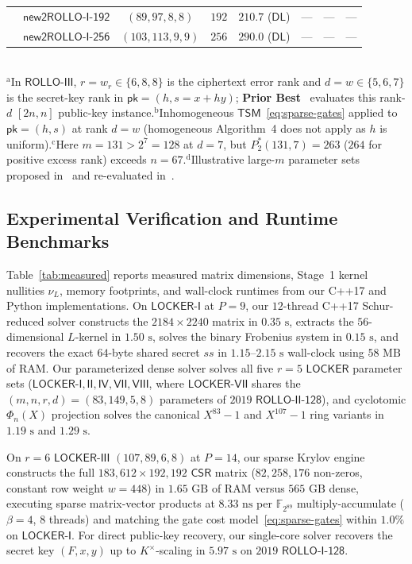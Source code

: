 \documentclass[11pt,a4paper]{article}
\theoremstyle{definition}
\theoremstyle{remark}
\newcommand{\F}{\mathbb{F}}
\newcommand{\TSM}{\mathsf{TSM}}
\begin{document}
\begin{table}[p]
\begin{tabular}{@{}llcccccc@{}}
 & $\mathsf{new2ROLLO\text{-}I\text{-}192}$ & $(89, 97, 8, 8)$ & $192$ & $210.7$ ($\mathsf{DL}$) & --- & --- & --- \\
 & $\mathsf{new2ROLLO\text{-}I\text{-}256}$ & $(103, 113, 9, 9)$ & $256$ & $290.0$ ($\mathsf{DL}$) & --- & --- & --- \\
\bottomrule
\end{tabular}
\\[0.3em]
{\scriptsize $^{\mathrm{a}}$In $\mathsf{ROLLO\text{-}III}$, $r = w_r \in \{6,8,8\}$ is the ciphertext error rank and $d = w \in \{5,6,7\}$ is the secret-key rank in $\mathsf{pk} = (h, s = x + hy)$; \textbf{Prior Best}~\cite{BBC+20,EVV26} evaluates this rank-$d$ $[2n,n]$ public-key instance.\quad $^{\mathrm{b}}$Inhomogeneous $\TSM$~\eqref{eq:sparse-gates} applied to $\mathsf{pk} = (h, s)$ at rank $d = w$ (homogeneous Algorithm~4 does not apply as $h$ is uniform).\quad $^{\mathrm{c}}$Here $m = 131 > 2^7 = 128$ at $d = 7$, but $P_2^*(131, 7) = 263$ ($264$ for positive excess rank) exceeds $n = 67$.\quad $^{\mathrm{d}}$Illustrative large-$m$ parameter sets proposed in~\cite{BBC+20} and re-evaluated in~\cite{BBGT23}.}
\end{table}

\subsection{Experimental Verification and Runtime Benchmarks}
Table~\ref{tab:measured} reports measured matrix dimensions, Stage~1 kernel nullities $\nu_L$, memory footprints, and wall-clock runtimes from our C++17 and Python implementations. On $\mathsf{LOCKER\text{-}I}$ at $P = 9$, our $12$-thread C++17 Schur-reduced solver constructs the $2184 \times 2240$ matrix in $0.35\text{ s}$, extracts the $56$-dimensional $L$-kernel in $1.50\text{ s}$, solves the binary Frobenius system in $0.15\text{ s}$, and recovers the exact $64$-byte shared secret $ss$ in $1.15\text{--}2.15\text{ s}$ wall-clock using $58\text{ MB}$ of RAM. Our parameterized dense solver solves all five $r=5$ $\mathsf{LOCKER}$ parameter sets ($\mathsf{LOCKER\text{-}I, II, IV, VII, VIII}$, where $\mathsf{LOCKER\text{-}VII}$ shares the $(m, n, r, d) = (83, 149, 5, 8)$ parameters of $2019$ $\mathsf{ROLLO\text{-}II\text{-}128}$), and cyclotomic $\Phi_n(X)$ projection solves the canonical $X^{83}-1$ and $X^{107}-1$ ring variants in $1.19\text{ s}$ and $1.29\text{ s}$.

On $r = 6$ $\mathsf{LOCKER\text{-}III}$ $(107, 89, 6, 8)$ at $P = 14$, our sparse Krylov engine constructs the full $183{,}612 \times 192{,}192$ $\mathsf{CSR}$ matrix ($82{,}258{,}176$ non-zeros, constant row weight $w = 448$) in $1.65\text{ GB}$ of RAM versus $565\text{ GB}$ dense, executing sparse matrix-vector products at $8.33\text{ ns}$ per $\F_{2^{89}}$ multiply-accumulate ($\beta = 4$, $8$ threads) and matching the gate cost model~\eqref{eq:sparse-gates} within $1.0\%$ on $\mathsf{LOCKER\text{-}I}$. For direct public-key recovery, our single-core solver recovers the secret key $(F, x, y)$ up to $K^\times$-scaling in $5.97\text{ s}$ on $2019$ $\mathsf{ROLLO\text{-}I\text{-}128}$.
\end{document}
